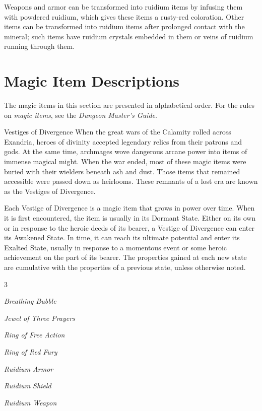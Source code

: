 \documentclass[10pt,a4paper,twoside,fancy,bg=print,twocolumn,openany,nodeprecatedcode]{dndbook}
\begin{document}
Weapons and armor can be transformed into ruidium items by infusing them with powdered ruidium, which gives these items a rusty-red coloration. Other items can be transformed into ruidium items after prolonged contact with the mineral; such items have ruidium crystals embedded in them or veins of ruidium running through them.

\section{Magic Item Descriptions}
The magic items in this section are presented in alphabetical order. For the rules on \textit{magic items}, see the \textit{Dungeon Master's Guide}.

\begin{DndSidebar}[float=!b]{Vestiges of Divergence}
When the great wars of the Calamity rolled across Exandria, heroes of divinity accepted legendary relics from their patrons and gods. At the same time, archmages wove dangerous arcane power into items of immense magical might. When the war ended, most of these magic items were buried with their wielders beneath ash and dust. Those items that remained accessible were passed down as heirlooms. These remnants of a lost era are known as the Vestiges of Divergence.



Each Vestige of Divergence is a magic item that grows in power over time. When it is first encountered, the item is usually in its Dormant State. Either on its own or in response to the heroic deeds of its bearer, a Vestige of Divergence can enter its Awakened State. In time, it can reach its ultimate potential and enter its Exalted State, usually in response to a momentous event or some heroic achievement on the part of its bearer. The properties gained at each new state are cumulative with the properties of a previous state, unless otherwise noted.



\end{DndSidebar}


\begin{itemize}
\begin{multicols}{3}
\item \textit{Breathing Bubble}
\item \textit{Jewel of Three Prayers}
\item \textit{Ring of Free Action}
\item \textit{Ring of Red Fury}
\item \textit{Ruidium Armor}
\item \textit{Ruidium Shield}
\item \textit{Ruidium Weapon}
\end{multicols}

\end{itemize}
\end{document}
